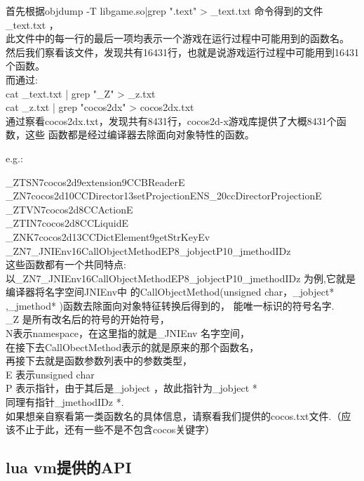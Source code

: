 首先根据objdump -T libgame.so|grep ".text" > \_text.txt 命令得到的文件\_text.txt ，\\
此文件中的每一行的最后一项均表示一个游戏在运行过程中可能用到的函数名。\\
然后我们察看该文件，发现共有16431行，也就是说游戏运行过程中可能用到16431个函数。\\
而通过:\\
cat \_text.txt | grep  "\_Z" > \_z.txt\\
cat \_z.txt | grep "cocos2dx" > cocos2dx.txt\\
通过察看cocos2dx.txt，发现共有8431行，cocos2d-x游戏库提供了大概8431个函数，这些
函数都是经过编译器去除面向对象特性的函数。
 
e.g.:

      \_ZTSN7cocos2d9extension9CCBReaderE\\
      \_ZN7cocos2d10CCDirector13setProjectionENS\_20ccDirectorProjectionE\\
      \_ZTVN7cocos2d8CCActionE\\
      \_ZTIN7cocos2d8CCLiquidE\\
      \_ZNK7cocos2d13CCDictElement9getStrKeyEv\\
      \_ZN7\_JNIEnv16CallObjectMethodEP8\_jobjectP10\_jmethodIDz\\
这些函数都有一个共同特点:\\
以\_ZN7\_JNIEnv16CallObjectMethodEP8\_jobjectP10\_jmethodIDz 为例,它就是编译器将名字空间JNIEnv中
的CallObjectMethod(unsigned char，\_jobject* ,\_jmethod* )函数去除面向对象特征转换后得到的，
能唯一标识的符号名字.\\
\_Z 是所有改名后的符号的开始符号，\\
N表示namespace，在这里指的就是\_JNIEnv 名字空间，\\
在接下去CallObectMethod表示的就是原来的那个函数名，\\
再接下去就是函数参数列表中的参数类型，\\
E 表示unsigned char\\
P 表示指针，由于其后是\_jobject ，故此指针为\_jobject *\\
同理有指针\_jmethodIDz *.\\
	
如果想亲自察看第一类函数名的具体信息，请察看我们提供的cocos.txt文件.（应该不止于此，还有一些不是不包含cocos关键字）\\

\subsection{lua vm提供的API}
\label{sec:so:lualib}

